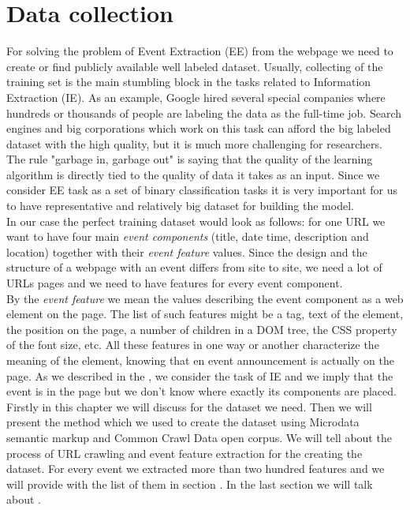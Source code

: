 \chapter{Data collection}
\label{chap:datacollect}

For solving the problem of Event Extraction (EE) from the webpage we need to create or find publicly available well labeled dataset. Usually, collecting of the training set is the main stumbling block in the tasks related to Information Extraction (IE). As an example, Google hired several special companies where hundreds or thousands of people are labeling the data as the full-time job. Search engines and big corporations which work on this task can afford the big labeled dataset with the high quality, but it is much more challenging for researchers. The rule "garbage in, garbage out" is saying that the quality of the learning algorithm is directly tied to the quality of data it takes as an input. Since we consider EE task as a set of binary classification tasks it is very important for us to have representative and relatively big dataset for building the model. \\

In our case the perfect training dataset would look as follows: for one URL we want to have four main \textit{event components} (title, date time, description and location) together with their \textit{event feature} values. Since the design and the structure of a webpage with an event differs from site to site, we need a lot of URLs pages and we need to have features for every event component. \\

By the \textit{event feature} we mean the values describing the event component as a web element on the page. The list of such features might be a tag, text of the element, the position on the page, a number of children in a DOM tree, the CSS property of the font size, etc. All these features in one way or another characterize the meaning of the element, knowing that en event announcement is actually on the page. As we described in the , we consider the task of IE and we imply that the event is in the page but we don't know where exactly its components are placed. \\

Firstly in this chapter we will discuss  for the dataset we need. Then we will present the method which we used to create the dataset using Microdata semantic markup and Common Crawl Data open corpus. We will tell about the process of URL crawling and event feature extraction for the creating the dataset. For every event we extracted more than two hundred features and we will provide with the list of them in section . In the last section we will talk about .


